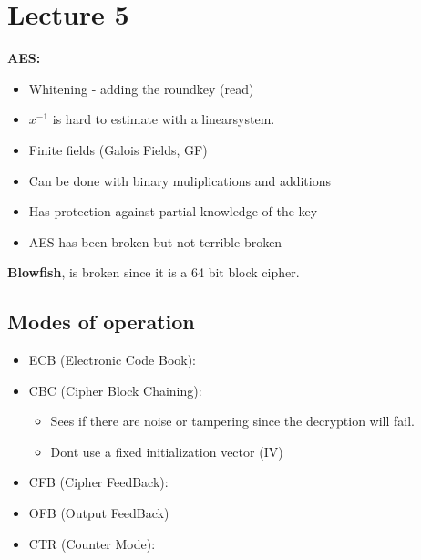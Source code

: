 \section{Lecture 5}

\textbf{AES:}\\
\begin{itemize}
\item Whitening - adding the roundkey (read)
\item \(x^{-1}\) is hard to estimate with a linearsystem.
\item Finite fields (Galois Fields, GF)
\item Can be done with binary muliplications and additions
\item Has protection against partial knowledge of the key
\item AES has been broken but not terrible broken
\end{itemize}

\textbf{Blowfish}, is broken since it is a 64 bit block cipher.

\subsection{Modes of operation}
\begin{itemize}
\item{ECB (Electronic Code Book):
  }

\item{CBC (Cipher Block Chaining):
    \begin{itemize}
    \item Sees if there are noise or tampering since the decryption will fail.
    \item Dont use a fixed initialization vector (IV)
    \end{itemize}
  }
\item{CFB (Cipher FeedBack):
    
  }

\item{OFB (Output FeedBack)
    
  }
\item{CTR (Counter Mode):

  }

  
\end{itemize}

